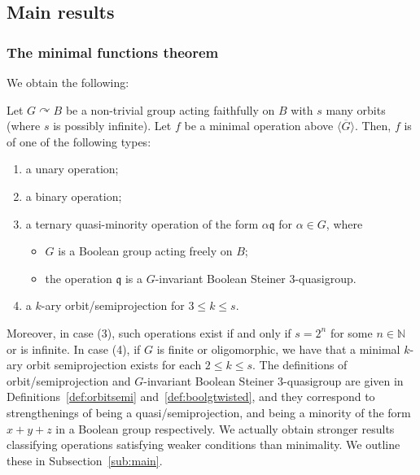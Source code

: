 \documentclass{article}
\newenvironment{customthm}[1]
  {\renewcommand\theinnercustomthm{#1}\innercustomthm}
  {\endinnercustomthm}
\theoremstyle{remark}
\theoremstyle{definition}
\def\acts{\curvearrowright}
\begin{document}
\subsection{Main results}

\subsubsection{The minimal functions theorem}

We obtain the following:

\begin{customthm}{A}\label{maintheorem} Let $G\acts B$ be a non-trivial group acting faithfully on $B$ with $s$ many orbits (where $s$ is possibly infinite). Let $f$ be a minimal operation above $\overline{\langle G \rangle}$. Then, $f$ is of one of the following types:
\begin{enumerate}
    \item a unary operation;
    \item a binary operation;
    \item \label{cas:min} a ternary quasi-minority operation of the form $\alpha\mathfrak{q}$ for $\alpha\in G$, where 
    \begin{itemize}
        \item $G$ is a Boolean group acting freely on $B$;
        \item the operation $\mathfrak{q}$ is a $G$-invariant Boolean Steiner $3$-quasigroup.
    \end{itemize}
    \item \label{cas:semi} a $k$-ary orbit\-/semiprojection for $3\leq k \leq s$. 
\end{enumerate}
    Moreover, in case (3), such operations exist if and only if $s=2^n$ for some $n\in\mathbb{N}$ or is infinite. In case (4), if $G$ is finite or oligomorphic, we have that a minimal $k$-ary orbit semiprojection exists for each $2\leq k\leq s$.
\end{customthm}
The definitions of orbit\-/semiprojection and $G$-invariant Boolean Steiner $3$-quasigroup are given in Definitions~\ref{def:orbitsemi} and~\ref{def:boolgtwisted}, and they correspond to strengthenings of being a quasi\-/semiprojection, and being a minority of the form $x+y+z$ in a Boolean group respectively. We actually obtain stronger results classifying operations satisfying weaker conditions than minimality. We outline these in Subsection~\ref{sub:main}.\\
\end{document}
